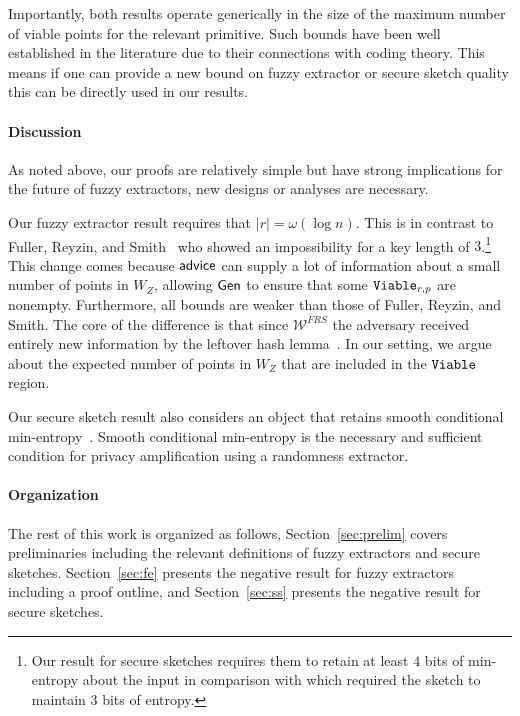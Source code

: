 Importantly, both results operate generically in the size of the maximum number of viable points for the relevant primitive.  Such bounds have been well established in the literature due to their connections with coding theory.  This means if one can provide a new bound on fuzzy extractor or secure sketch quality this can be directly used in our results. 


\paragraph{Discussion}
As noted above, our proofs are relatively simple but have strong implications for the future of fuzzy extractors, new designs or analyses are necessary.

Our fuzzy extractor result requires that $|r| = \omega(\log n)$.  This is in contrast to Fuller, Reyzin, and Smith~\cite{fuller2020fuzzy} who showed an impossibility for a key length of $3$.\footnote{Our result for secure sketches requires them to retain at least $4$ bits of min-entropy about the input in comparison with \cite{fuller2020computational} which required the sketch to maintain $3$ bits of entropy.} This change comes because ${\mathsf{advice}}$ can supply a lot of information about a small number of points in $W_Z$, allowing ${\mathsf{Gen}}$ to ensure that some $\mathtt{Viable}_{r,p}$ are nonempty. Furthermore, all bounds are weaker than those of Fuller, Reyzin, and Smith.  The core of the difference is that since $\mathcal{W}^{FRS}$ the adversary received entirely new information by the leftover hash lemma~\cite{haastad1993construction,barak2011leftover}. In our setting, we argue about the expected number of points in $W_Z$ that are included in the $\mathtt{Viable}$ region. 

Our secure sketch result also considers an object that retains smooth conditional min-entropy~\cite{renner2005simple}.  %
Smooth conditional min-entropy is the necessary and sufficient condition for privacy amplification using a randomness extractor. 


\paragraph{Organization} The rest of this work is organized as follows, Section~\ref{sec:prelim} covers preliminaries including the relevant definitions of fuzzy extractors and secure sketches.  Section~\ref{sec:fe} presents the negative result for fuzzy extractors including a proof outline, and Section~\ref{sec:ss} presents the negative result for secure sketches.


